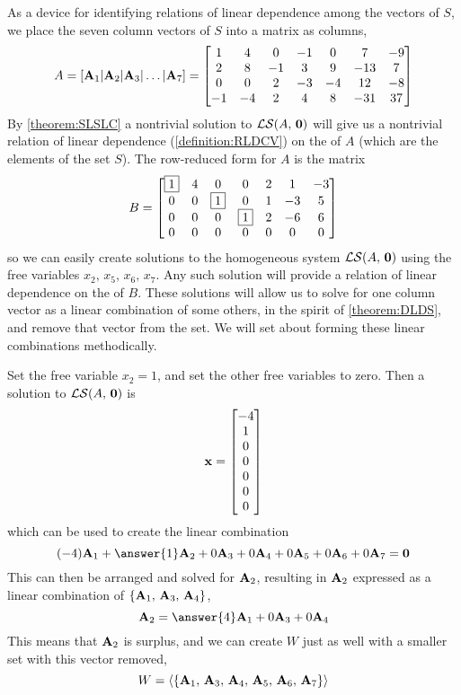 \documentclass{ximera}
\begin{document}
\begin{example}
  As a device for identifying relations of linear dependence among the
  vectors of $S$, we place the seven column vectors of $S$ into a
  matrix as columns,
  \[
    A=\left\lbrack\mathbf{A}_{1}|\mathbf{A}_{2}|\mathbf{A}_{3}|\ldots|\mathbf{A}_{7}\right\rbrack=
    \begin{bmatrix}
      1 & 4 & 0 & -1 & 0 & 7 &  -9 \\
      2 & 8 &  -1 & 3 & 9 &  -13 & 7\\
      0 & 0 &  2 & -3 & -4 & 12 &  -8\\
      -1 &  -4 & 2 & 4 & 8 &  -31 & 37
    \end{bmatrix}
  \]
  By \ref{theorem:SLSLC} a nontrivial solution to $\mathcal{LS}\!\left(A,\,\mathbf{0}\right)$
  will give us a nontrivial relation of linear dependence
  (\ref{definition:RLDCV}) on the  of $A$ (which are the
  elements of the set $S$).  The row-reduced form for $A$ is the
  matrix
  \[
    B=\begin{bmatrix}
      \fbox{1} & 4 & 0 & 0 & 2 & 1 & -3\\
      0 & 0 & \fbox{1} &  0 & 1 &  -3 & 5\\
      0 & 0 &  0 & \fbox{1} & 2 &  -6 & 6\\
      0 & 0 &  0 & 0 & 0 & 0 & 0
    \end{bmatrix}
  \]
  so we can easily create solutions to the homogeneous system
  $\mathcal{LS}\!\left(A,\,\mathbf{0}\right)$ using the free variables $x_2,\,x_5,\,x_6,\,x_7$.
  Any such solution will provide a relation of linear dependence on
  the  of $B$.
  These solutions will allow us to solve for one column vector as a
  linear combination of some others, in the spirit of
  \ref{theorem:DLDS}, and remove that vector from the set.  We will
  set about forming these linear combinations methodically.

  Set the free variable $x_2=1$, and set the other free variables to
  zero.  Then a solution to $\mathcal{LS}\!\left(A,\,\mathbf{0}\right)$ is
  \[
    \mathbf{x}=\begin{bmatrix}-4\\1\\0\\0\\0\\0\\0\end{bmatrix}
  \]
  which can be used to create the linear combination
  \[
    (-4)\vect{A}_1+
    \answer{1}\vect{A}_2+
    0\vect{A}_3+
    0\vect{A}_4+
    0\vect{A}_5+
    0\vect{A}_6+
    0\vect{A}_7
    =\zerovector
  \]
  This can then be arranged and solved for $\mathbf{A}_2$, resulting in
  $\mathbf{A}_2$ expressed as a linear combination of
  $\left\{\mathbf{A}_1,\,\mathbf{A}_3,\,\mathbf{A}_4\right\}$,
  \[
    \vect{A}_2=
    \answer{4}\vect{A}_1+
    0\vect{A}_3+
    0\vect{A}_4
  \]
  This means that $\mathbf{A}_2$ is surplus, and we can create $W$ just
  as well with a smaller set with this vector removed,
  \[
    W=\left\langle\left\{\mathbf{A}_1,\,\mathbf{A}_3,\,\mathbf{A}_4,\,\mathbf{A}_5,\,\mathbf{A}_6,\,\mathbf{A}_7\right\}\right\rangle
  \]


\end{example}
\end{document}
